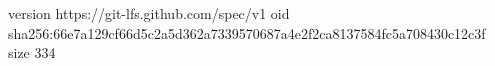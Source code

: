 version https://git-lfs.github.com/spec/v1
oid sha256:66e7a129cf66d5c2a5d362a7339570687a4e2f2ca8137584fc5a708430c12c3f
size 334
